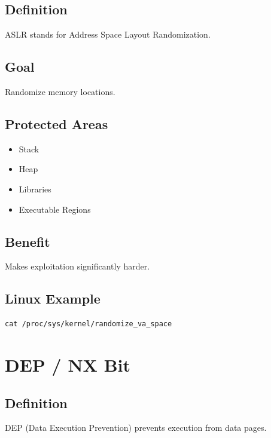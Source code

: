 \subsection{Definition}

ASLR stands for Address Space Layout Randomization.

\subsection{Goal}

Randomize memory locations.

\subsection{Protected Areas}

\begin{itemize}
\item Stack
\item Heap
\item Libraries
\item Executable Regions
\end{itemize}

\subsection{Benefit}

Makes exploitation significantly harder.

\subsection{Linux Example}

\begin{verbatim}
cat /proc/sys/kernel/randomize_va_space
\end{verbatim}

\section{DEP / NX Bit}

\subsection{Definition}

DEP (Data Execution Prevention) prevents execution from data pages.

